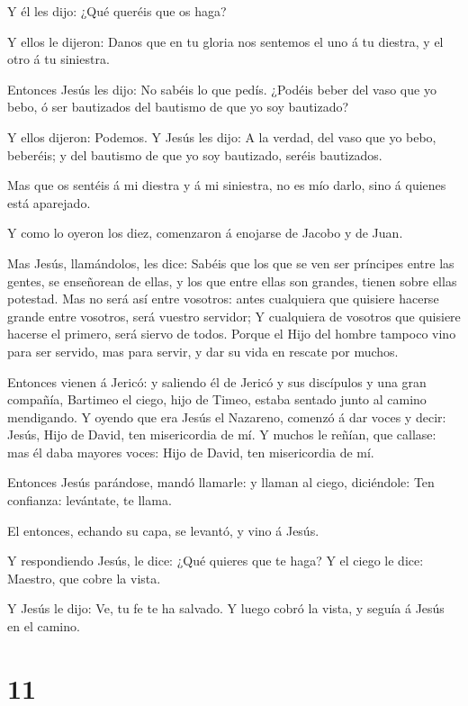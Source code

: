  Y él les dijo: ¿Qué queréis que os haga?

 Y ellos le dijeron: Danos que en tu gloria nos sentemos el
uno á tu diestra, y el otro á tu siniestra.

 Entonces Jesús les dijo: No sabéis lo que pedís. ¿Podéis
beber del vaso que yo bebo, ó ser bautizados del bautismo de que yo soy
bautizado?

 Y ellos dijeron: Podemos. Y Jesús les dijo: A la verdad,
del vaso que yo bebo, beberéis; y del bautismo de que yo soy bautizado,
seréis bautizados.

 Mas que os sentéis á mi diestra y á mi siniestra, no es
mío darlo, sino á quienes está aparejado.

 Y como lo oyeron los diez, comenzaron á enojarse de Jacobo
y de Juan.

 Mas Jesús, llamándolos, les dice: Sabéis que los que se
ven ser príncipes entre las gentes, se enseñorean de ellas, y los que
entre ellas son grandes, tienen sobre ellas potestad.  Mas
no será así entre vosotros: antes cualquiera que quisiere hacerse grande
entre vosotros, será vuestro servidor;  Y cualquiera de
vosotros que quisiere hacerse el primero, será siervo de todos.
 Porque el Hijo del hombre tampoco vino para ser servido,
mas para servir, y dar su vida en rescate por muchos.

 Entonces vienen á Jericó: y saliendo él de Jericó y sus
discípulos y una gran compañía, Bartimeo el ciego, hijo de Timeo, estaba
sentado junto al camino mendigando.  Y oyendo que era Jesús
el Nazareno, comenzó á dar voces y decir: Jesús, Hijo de David, ten
misericordia de mí.  Y muchos le reñían, que callase: mas
él daba mayores voces: Hijo de David, ten misericordia de mí.

 Entonces Jesús parándose, mandó llamarle: y llaman al
ciego, diciéndole: Ten confianza: levántate, te llama.

 El entonces, echando su capa, se levantó, y vino á Jesús.

 Y respondiendo Jesús, le dice: ¿Qué quieres que te haga? Y
el ciego le dice: Maestro, que cobre la vista.

 Y Jesús le dijo: Ve, tu fe te ha salvado. Y luego cobró la
vista, y seguía á Jesús en el camino.

\hypertarget{section-10}{%
\section{11}\label{section-10}}


